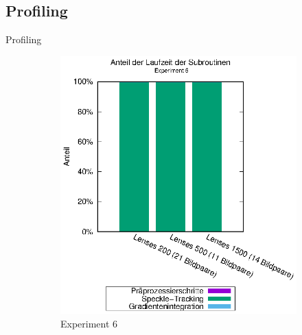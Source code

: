 \subsection{Profiling}
\begin{frame}[allowframebreaks]{Profiling}
	\begin{center}
		\begin{figure}[h]
			\hspace{-0.7cm}
			\begin{subfigure}[b]{0.4\linewidth}
				\centering
				\includegraphics[width=\linewidth]{pdf/main_exp6.eps}
				\caption{Experiment 6}
			\end{subfigure}
			\hspace{-1.0cm}
			\begin{subfigure}[b]{0.4\linewidth}
				\centering

\end{subfigure}
\end{figure}
\end{center}
\end{frame}
